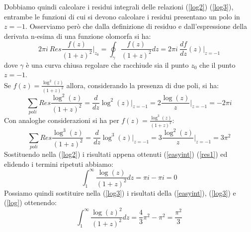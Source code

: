 	Dobbiamo quindi calcolare i residui integrali delle relazioni (\ref{log2}) (\ref{log3}), entrambe le funzioni di cui si devono calcolare i residui 
	presentano un polo in $z=-1$. Osserviamo però che dalla definizione di residuo 
	e dall'espressione della derivata n-esima di una funzione olomorfa si ha:
	\begin{equation}
		\label{trickfigo}
		2\pi i\ Res\frac{f(z)}{(1+z)^2}\bigg|_{z_0}=\oint_\gamma\frac{f(z)}{(1+z)^2}dz=2\pi i\ \frac{df}{dz}(z)\bigg|_{z=-1}
	\end{equation}
	dove $\gamma$ è una curva chiusa regolare che racchiude sia il punto $z_0$ che il punto $z=-1$.\\
    Se $f(z)=\frac{\log^2(z)}{(1+z)^2}$ allora, considerando la presenza di due poli, si ha:
		\begin{equation}\label{res1}
			\sum_{poli} Res\frac{\log^2(z)}{(1+z)^2}=\frac{d}{dz} \log^2(z) \bigg|_{z=-1}=
            2\frac{\log(z)}{z}\bigg|_{z=-1}=-2\pi i
		\end{equation}
	Con analoghe considerazioni si ha per $f(z)=\frac{\log^3(z)}{(1+z)^2}$:
	\begin{equation}\label{res2}
		\sum_{poli} Res\frac{\log^3(z)}{(1+z)^2}= \frac{d}{dz} \log^3(z) \bigg|_{z=-1}=
		3\frac{\log^2(z)}{z}\bigg|_{z=-1}=3\pi^2
	\end{equation}
	Sostituendo nella (\ref{log2}) i risultati appena ottenuti (\ref{easyint}) (\ref{res1}) ed elidendo i termini ripetuti abbiamo:
	\begin{equation}
        \int_{1}^{\infty}\frac{\log(z)}{(1+z)^2}dz=\pi i-\pi i=0
		\label{log}
	\end{equation}
    Possiamo quindi sostituire nella (\ref{log3}) i risultati della (\ref{easyint}), (\ref{log3}) e (\ref{log}) ottenendo:
	\begin{equation}
		\int_{1}^{\infty}\frac{\log(z)^2}{(1+z)^2}dz=\frac{4}{3}\pi^2-\pi^2=\frac{\pi^2}{3}
	\end{equation} 




    
